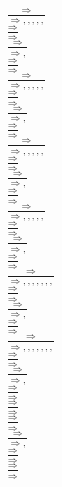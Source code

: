 \documentclass[11pt]{article}
\begin{document}
\begin{center}
\\$\frac{\Rightarrow }{\Rightarrow , , , , , }$
\bigskip
\\$\frac{\Rightarrow }{\Rightarrow }$
\bigskip
\\$\frac{\Rightarrow }{\Rightarrow , }$
\bigskip
\\$\frac{\Rightarrow }{\Rightarrow }$
\bigskip
\\$\frac{\Rightarrow }{\Rightarrow , , , , , }$
\bigskip
\\$\frac{\Rightarrow }{\Rightarrow }$
\bigskip
\\$\frac{\Rightarrow }{\Rightarrow , }$
\bigskip
\\$\frac{\Rightarrow }{\Rightarrow }$
\bigskip
\\$\frac{\Rightarrow }{\Rightarrow , , , , , }$
\bigskip
\\$\frac{\Rightarrow }{\Rightarrow }$
\bigskip
\\$\frac{\Rightarrow }{\Rightarrow , }$
\bigskip
\\$\frac{\Rightarrow }{\Rightarrow }$
\bigskip
\\$\frac{\Rightarrow }{\Rightarrow , , , , , }$
\bigskip
\\$\frac{\Rightarrow }{\Rightarrow }$
\bigskip
\\$\frac{\Rightarrow }{\Rightarrow , }$
\bigskip
\\$\frac{\Rightarrow }{\Rightarrow }$
\bigskip
\\$\frac{\Rightarrow }{\Rightarrow , , , , , , , }$
\bigskip
\\$\frac{\Rightarrow }{\Rightarrow }$
\bigskip
\\$\frac{\Rightarrow }{\Rightarrow , }$
\bigskip
\\$\frac{\Rightarrow }{\Rightarrow }$
\bigskip
\\$\frac{\Rightarrow }{\Rightarrow , , , , , , , }$
\bigskip
\\$\frac{\Rightarrow }{\Rightarrow }$
\bigskip
\\$\frac{\Rightarrow }{\Rightarrow , }$
\bigskip
\\$\frac{\Rightarrow }{\Rightarrow }$
\bigskip
\\$\frac{\Rightarrow }{\Rightarrow }$
\bigskip
\\$\frac{\Rightarrow }{\Rightarrow }$
\bigskip
\\$\frac{\Rightarrow }{\Rightarrow , }$
\bigskip
\\$\frac{\Rightarrow }{\Rightarrow }$
\bigskip
\\$\frac{\Rightarrow }{\Rightarrow }$
\bigskip

\end{center}
\end{document}
